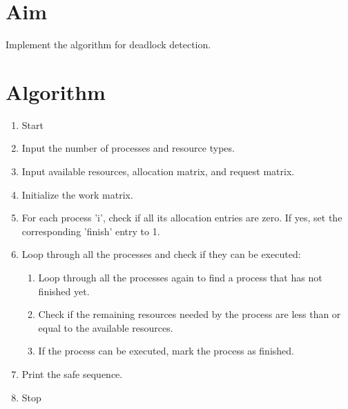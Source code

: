
\section{Aim}
Implement the algorithm for deadlock detection.

\section{Algorithm}
\begin{enumerate}
   \item Start
   \item Input the number of processes and resource types.
   \item Input available resources, allocation matrix, and request matrix.
   \item Initialize the work matrix.
   \item For each process 'i', check if all its allocation entries are zero. If yes, set the corresponding 'finish' entry to 1.
   \item Loop through all the processes and check if they can be executed:
   \begin{enumerate}
       \item Loop through all the processes again to find a process that has not finished yet.
       \item Check if the remaining resources needed by the process are less than or equal to the available resources.
       \item If the process can be executed, mark the process as finished.
   \end{enumerate}
   \item Print the safe sequence.
   \item Stop
\end{enumerate}

